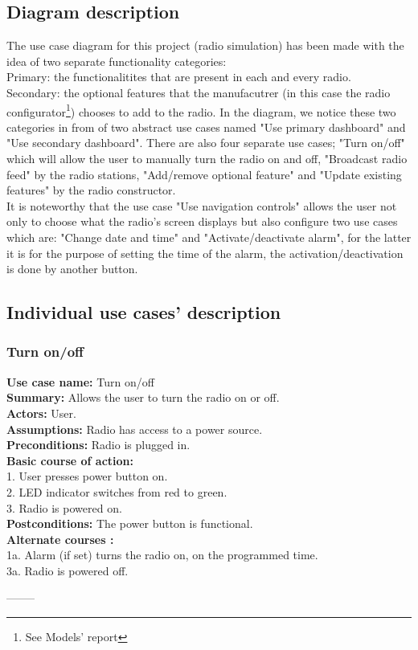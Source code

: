 \documentclass[11pt]{article}
\begin{document}
\subsection{Diagram description}
The use case diagram for this project (radio simulation) has been made with the idea of two separate functionality categories:\\
Primary: the functionalitites that are present in each and every radio.\\
Secondary: the optional features that the manufacutrer (in this case the radio configurator\footnote{See Models' report}) chooses to add to the radio.
In the diagram, we notice these two categories in from of two abstract use cases named "Use primary dashboard" and "Use secondary dashboard". There are also four separate use cases; "Turn on/off" which will allow the user to manually turn the radio on and off, "Broadcast radio feed" by the radio stations, "Add/remove optional feature" and "Update existing features" by the radio constructor.\\
It is noteworthy that the use case "Use navigation controls" allows the user not only to choose what the radio's screen displays but also configure two use cases which are: "Change date and time" and "Activate/deactivate alarm", for the latter it is for the purpose of setting the time of the alarm, the activation/deactivation is done by another button.

\subsection{Individual use cases' description}
\subsubsection{Turn on/off}
\textbf{Use case name:} Turn on/off\\
\textbf{Summary:} Allows the user to turn the radio on or off.\\
\textbf{Actors:} User.\\
\textbf{Assumptions:} Radio has access to a power source.\\
\textbf{Preconditions:} Radio is plugged in.\\
\textbf{Basic course of action:}\\
\hspace*{10mm}1. User presses power button on.\\
\hspace*{10mm}2. LED indicator switches from red to green.\\
\hspace*{10mm}3. Radio is powered on.\\
\textbf{Postconditions: }The power button is functional.\\
\textbf{Alternate courses :}\\
\hspace*{10mm}1a. Alarm (if set) turns the radio on, on the programmed time.\\ 
\hspace*{10mm}3a. Radio is powered off.
\begin{center}--------\end{center}
\end{document}
